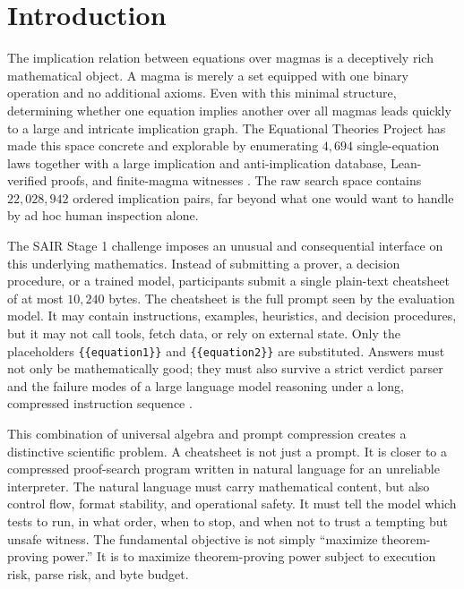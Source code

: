 \documentclass[12pt]{amsart}
\begin{document}
\section{Introduction}

The implication relation between equations over magmas is a deceptively rich mathematical object. A magma is merely a set equipped with one binary operation and no additional axioms. Even with this minimal structure, determining whether one equation implies another over all magmas leads quickly to a large and intricate implication graph. The Equational Theories Project has made this space concrete and explorable by enumerating $4{,}694$ single-equation laws together with a large implication and anti-implication database, Lean-verified proofs, and finite-magma witnesses \cite{ETPRepo2026}. The raw search space contains $22{,}028{,}942$ ordered implication pairs, far beyond what one would want to handle by ad hoc human inspection alone.

The SAIR Stage 1 challenge imposes an unusual and consequential interface on this underlying mathematics. Instead of submitting a prover, a decision procedure, or a trained model, participants submit a single plain-text cheatsheet of at most $10{,}240$ bytes. The cheatsheet is the full prompt seen by the evaluation model. It may contain instructions, examples, heuristics, and decision procedures, but it may not call tools, fetch data, or rely on external state. Only the placeholders \texttt{\{\{equation1\}\}} and \texttt{\{\{equation2\}\}} are substituted. Answers must not only be mathematically good; they must also survive a strict verdict parser and the failure modes of a large language model reasoning under a long, compressed instruction sequence \cite{SAIROverview2026,SAIRJudge2026}.

This combination of universal algebra and prompt compression creates a distinctive scientific problem. A cheatsheet is not just a prompt. It is closer to a compressed proof-search program written in natural language for an unreliable interpreter. The natural language must carry mathematical content, but also control flow, format stability, and operational safety. It must tell the model which tests to run, in what order, when to stop, and when not to trust a tempting but unsafe witness. The fundamental objective is not simply ``maximize theorem-proving power.'' It is to maximize theorem-proving power subject to execution risk, parse risk, and byte budget.
\end{document}

